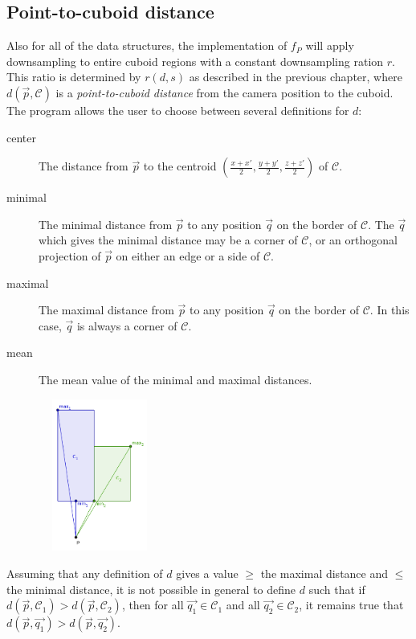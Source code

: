 \documentclass[a4paper,10pt,abstracton,notitlepage]{scrreprt}
\begin{document}
\subsection{Point-to-cuboid distance}
Also for all of the data structures, the implementation of $f_{P}$ will apply downsampling to entire cuboid regions with a constant downsampling ration $r$. This ratio is determined by $r(d, s)$ as described in the previous chapter, where $d(\overrightarrow{p}, \mathcal{C})$ is a \emph{point-to-cuboid distance} from the camera position to the cuboid. The program allows the user to choose between several definitions for $d$:
\begin{description}
\item[center] The distance from $\overrightarrow{p}$ to the centroid $( \frac{x + x'}{2}, \frac{y + y'}{2}, \frac{z + z'}{2} )$ of $\mathcal{C}$.
\item[minimal] The minimal distance from $\overrightarrow{p}$ to any position $\overrightarrow{q}$ on the border of $\mathcal{C}$. The $\overrightarrow{q}$ which gives the minimal distance may be a corner of $\mathcal{C}$, or an orthogonal projection of $\overrightarrow{p}$ on either an edge or a side of $\mathcal{C}$.
\item[maximal] The maximal distance from $\overrightarrow{p}$ to any position $\overrightarrow{q}$ on the border of $\mathcal{C}$. In this case, $\overrightarrow{q}$ is always a corner of $\mathcal{C}$.
\item[mean] The mean value of the minimal and maximal distances.
\end{description}

\begin{figure}
\includegraphics[width=4cm,height=5cm]{minMaxDistance.png}
\label{fig:min_max_c_d}
\end{figure}
Assuming that any definition of $d$ gives a value $\geq$ the maximal distance and $\leq$ the minimal distance, it is not possible in general to define $d$ such that if $d(\overrightarrow{p}, \mathcal{C_{1}}) > d(\overrightarrow{p}, \mathcal{C_{2}})$, then for all $\overrightarrow{q_{1}} \in \mathcal{C_{1}}$ and all $\overrightarrow{q_{2}} \in \mathcal{C_{2}}$, it remains true that $d(\overrightarrow{p}, \overrightarrow{q_{1}}) > d(\overrightarrow{p}, \overrightarrow{q_{2}})$. 
\end{document}
